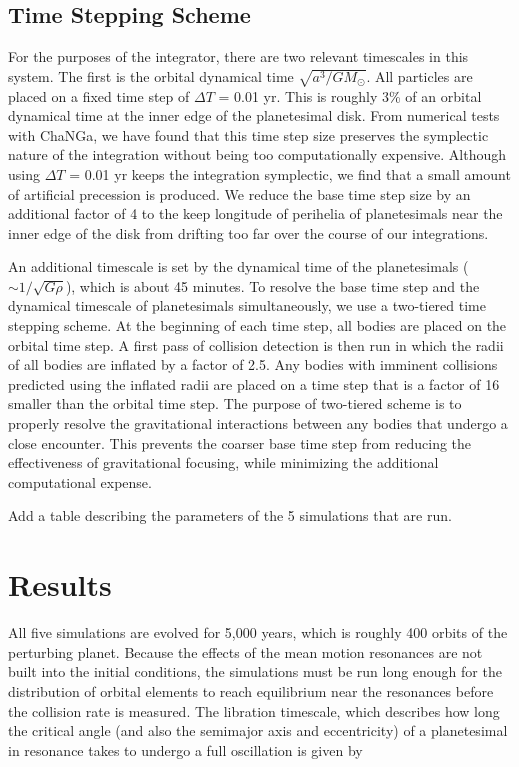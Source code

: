 \documentclass[onecolumn]{aastex63}
\begin{document}
\subsection{Time Stepping Scheme}\label{sec:timestep}

For the purposes of the integrator, there are two relevant timescales in this system. The first is the orbital dynamical time $\sqrt{a^3/
G M_{\odot}}$. All particles are placed on a fixed time step of $\Delta T$ = 0.01 yr. This is roughly 3\% of an orbital dynamical time at 
the inner edge of the planetesimal disk. From numerical tests with {\sc ChaNGa}, we have found that this time step size preserves 
the symplectic nature of the integration without being too computationally expensive. Although using $\Delta T$ = 0.01 yr keeps the 
integration symplectic, we find that a small amount of artificial precession is produced. We reduce the base time step size by an additional 
factor of 4 to the keep longitude of perihelia of planetesimals near the inner edge of the disk from drifting too far over the course of our 
integrations.

An additional timescale is set by the dynamical time of the planetesimals ($\sim 1/\sqrt{G \rho}$), which is about 45 minutes. To 
resolve the base time step and the dynamical timescale of planetesimals simultaneously, we use a two-tiered time stepping scheme. 
At the beginning of each time step, all bodies are placed on the orbital time step. A first pass of collision detection is then run in 
which the radii of all bodies are inflated by a factor of 2.5. Any bodies with imminent collisions predicted using the inflated radii are 
placed on a time step that is a factor of 16 smaller than the orbital time step. The purpose of two-tiered scheme is to properly resolve 
the gravitational interactions between any bodies that undergo a close encounter. This prevents the coarser base time step from 
reducing the effectiveness of gravitational focusing, while minimizing the additional computational expense.

Add a table describing the parameters of the 5 simulations that are run.

\section{Results} \label{sec:results}

All five simulations are evolved for 5,000 years, which is roughly 400 orbits of the perturbing planet. Because the effects of the mean motion resonances are not built into the initial conditions, the simulations must be run long enough for the distribution of orbital elements to reach equilibrium near the resonances before the collision rate is measured. The libration timescale, which describes how long the critical angle (and also the semimajor axis and eccentricity) of a planetesimal in resonance takes to undergo a full oscillation is given by
\end{document}
